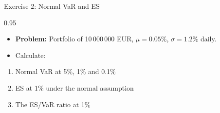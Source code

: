 \documentclass[9pt, aspectratio=169, t]{beamer}
\begin{document}
\begin{frame}{Exercise 2: Normal VaR and ES}
\begin{cminipage}{0.95\textwidth}
    \begin{itemize}\setlength{\itemsep}{0pt}
        \item \textbf{Problem:} Portfolio of 10\,000\,000 EUR, $\mu = 0.05\%$, $\sigma = 1.2\%$ daily.
        \item Calculate:
    \end{itemize}
    \begin{enumerate}\setlength{\itemsep}{0pt}
        \item Normal VaR at 5\%, 1\% and 0.1\%
        \item ES at 1\% under the normal assumption
        \item The ES/VaR ratio at 1\%
    \end{enumerate}
\end{cminipage}
\end{frame}
\end{document}
